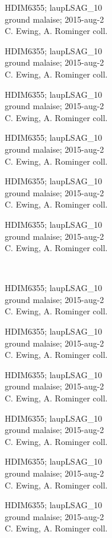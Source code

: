 \documentclass[2pt]{extarticle}
\begin{document}
\noindent
\parbox{0.16\textwidth}{\tiny \raggedright \rule[-0.3\baselineskip]{0pt}{10pt}HDIM6355; laupLSAG\_10\\ ground malaise; 2015-aug-2\\ C. Ewing, A. Rominger coll.}
\parbox{0.16\textwidth}{\tiny \raggedright \rule[-0.3\baselineskip]{0pt}{10pt}HDIM6355; laupLSAG\_10\\ ground malaise; 2015-aug-2\\ C. Ewing, A. Rominger coll.}
\parbox{0.16\textwidth}{\tiny \raggedright \rule[-0.3\baselineskip]{0pt}{10pt}HDIM6355; laupLSAG\_10\\ ground malaise; 2015-aug-2\\ C. Ewing, A. Rominger coll.}
\parbox{0.16\textwidth}{\tiny \raggedright \rule[-0.3\baselineskip]{0pt}{10pt}HDIM6355; laupLSAG\_10\\ ground malaise; 2015-aug-2\\ C. Ewing, A. Rominger coll.}
\parbox{0.16\textwidth}{\tiny \raggedright \rule[-0.3\baselineskip]{0pt}{10pt}HDIM6355; laupLSAG\_10\\ ground malaise; 2015-aug-2\\ C. Ewing, A. Rominger coll.}
\parbox{0.16\textwidth}{\tiny \raggedright \rule[-0.3\baselineskip]{0pt}{10pt}HDIM6355; laupLSAG\_10\\ ground malaise; 2015-aug-2\\ C. Ewing, A. Rominger coll.} \\ 
\vspace{0.001in} 

\noindent
\parbox{0.16\textwidth}{\tiny \raggedright \rule[-0.3\baselineskip]{0pt}{10pt}HDIM6355; laupLSAG\_10\\ ground malaise; 2015-aug-2\\ C. Ewing, A. Rominger coll.}
\parbox{0.16\textwidth}{\tiny \raggedright \rule[-0.3\baselineskip]{0pt}{10pt}HDIM6355; laupLSAG\_10\\ ground malaise; 2015-aug-2\\ C. Ewing, A. Rominger coll.}
\parbox{0.16\textwidth}{\tiny \raggedright \rule[-0.3\baselineskip]{0pt}{10pt}HDIM6355; laupLSAG\_10\\ ground malaise; 2015-aug-2\\ C. Ewing, A. Rominger coll.}
\parbox{0.16\textwidth}{\tiny \raggedright \rule[-0.3\baselineskip]{0pt}{10pt}HDIM6355; laupLSAG\_10\\ ground malaise; 2015-aug-2\\ C. Ewing, A. Rominger coll.}
\parbox{0.16\textwidth}{\tiny \raggedright \rule[-0.3\baselineskip]{0pt}{10pt}HDIM6355; laupLSAG\_10\\ ground malaise; 2015-aug-2\\ C. Ewing, A. Rominger coll.}
\parbox{0.16\textwidth}{\tiny \raggedright \rule[-0.3\baselineskip]{0pt}{10pt}HDIM6355; laupLSAG\_10\\ ground malaise; 2015-aug-2\\ C. Ewing, A. Rominger coll.} \\ 
\vspace{0.001in} 
\end{document}
